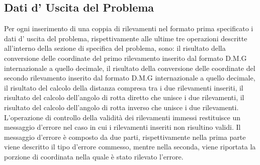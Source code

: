 \documentclass{article}
\begin{document}
\subsection{Dati d' Uscita del Problema}
Per ogni inserimento di una coppia di rilevamenti nel formato prima specificato i dati d' uscita del problema, rispettivamente alle ultime tre operazioni descritte all'interno della sezione di specifica del problema, sono: il risultato della conversione delle coordinate del primo rilevamento inserito dal formato D.M.G internazionale a quello decimale, il risultato della conversione delle coordinate del secondo rilevamento inserito dal formato D.M.G internazionale a quello decimale, il risultato del calcolo della distanza compresa tra i due rilevamenti inseriti, il risultato del calcolo dell'angolo di rotta diretto che unisce i due rilevamenti, il risultato del calcolo dell'angolo di rotta inverso che unisce i due rilevamenti. 
L'operazione di controllo della validità dei rilevamenti immessi restituisce un messaggio d'errore nel caso in cui i rilevamenti inseriti non risultino validi. Il messaggio d'errore è composto da due parti, rispettivamente nella prima parte viene descritto il tipo d'errore commesso, mentre nella seconda, viene riportata la porzione di coordinata nella quale è stato rilevato l'errore. 
\end{document}
